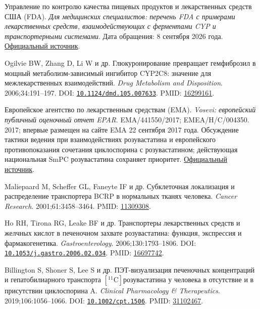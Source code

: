 \documentclass[11pt]{article}
\begin{document}
\begin{description}[before={\microtypesetup{expansion=false}\setlength{\RaggedRightRightskip}{0pt plus 4em}\RaggedRight}]
\item[{[38]}] Управление по контролю качества пищевых продуктов и лекарственных средств США (FDA). \textit{Для медицинских специалистов: перечень FDA с примерами лекарственных средств, взаимодействующих с ферментами CYP и транспортерными системами}. Дата обращения: 8 сентября 2026 года. \href{https://www.fda.gov/drugs/drug-interactions-labeling/healthcare-professionals-fdas-examples-drugs-interact-cyp-enzymes-and-transporter-systems}{Официальный источник}.
\item[{[39]}] Ogilvie BW, Zhang D, Li W и др. Глюкуронирование превращает гемфиброзил в мощный метаболизм-зависимый ингибитор CYP2C8: значение для межлекарственных взаимодействий. \textit{\foreignlanguage{english}{Drug Metabolism and Disposition}}. 2006;34:191--197. DOI: \href{https://doi.org/10.1124/dmd.105.007633}{\nolinkurl{10.1124/dmd.105.007633}}. PMID: \href{https://pubmed.ncbi.nlm.nih.gov/16299161/}{16299161}.
\item[{[40]}] Европейское агентство по лекарственным средствам (EMA). \textit{Vosevi: европейский публичный оценочный отчет EPAR}. EMA/441550/2017; EMEA/H/C/004350. 2017; впервые размещен на сайте EMA 22 сентября 2017 года. Обсуждение тактики ведения при взаимодействиях розувастатина и европейского противопоказания сочетания циклоспорина с розувастатином; действующая национальная SmPC розувастатина сохраняет приоритет. \href{https://www.ema.europa.eu/documents/assessment-report/vosevi-epar-public-assessment-report_en.pdf}{Официальный источник}.
\item[{[41]}] Maliepaard M, Scheffer GL, Faneyte IF и др. Субклеточная локализация и распределение транспортера BCRP в нормальных тканях человека. \textit{\foreignlanguage{english}{Cancer Research}}. 2001;61:3458--3464. PMID: \href{https://pubmed.ncbi.nlm.nih.gov/11309308/}{11309308}.
\item[{[42]}] Ho RH, Tirona RG, Leake BF и др. Транспортеры лекарственных средств и желчных кислот в печеночном захвате розувастатина: функция, экспрессия и фармакогенетика. \textit{\foreignlanguage{english}{Gastroenterology}}. 2006;130:1793--1806. DOI: \href{https://doi.org/10.1053/j.gastro.2006.02.034}{\nolinkurl{10.1053/j.gastro.2006.02.034}}. PMID: \href{https://pubmed.ncbi.nlm.nih.gov/16697742/}{16697742}.
\item[{[43]}] Billington S, Shoner S, Lee S и др. ПЭТ-визуализация печеночных концентраций и гепатобилиарного транспорта \([^{11}\mathrm{C}]\)розувастатина у человека в отсутствие и в присутствии циклоспорина A. \textit{\foreignlanguage{english}{Clinical Pharmacology \& Therapeutics}}. 2019;106:1056--1066. DOI: \href{https://doi.org/10.1002/cpt.1506}{\nolinkurl{10.1002/cpt.1506}}. PMID: \href{https://pubmed.ncbi.nlm.nih.gov/31102467/}{31102467}.

\end{description}
\end{document}
